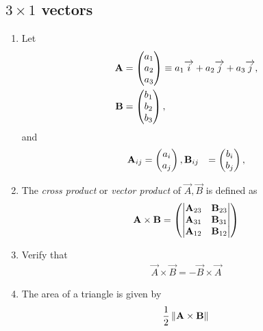 \documentclass[journal,12pt,twocolumn]{IEEEtran}
\renewcommand\thesection{\arabic{section}}
\renewcommand\thesubsection{\thesection.\arabic{subsection}}
\begin{document}
\subsection{$3\times 1$ vectors}
\renewcommand{\theequation}{\theenumi}
\begin{enumerate}[label=\thesubsection.\arabic*.,ref=\thesubsection.\theenumi]

\item Let 
\begin{align}
  \mathbf{A} &= \begin{pmatrix}a_1\\a_2 \\ a_3\end{pmatrix} \equiv a_1\overrightarrow{i}+a_2\overrightarrow{j}+a_3\overrightarrow{j}, 
  \\
  \mathbf{B} &= \begin{pmatrix}b_1\\b_2 \\ b_3\end{pmatrix}, 
\end{align}
and 
\begin{align}
  \mathbf{A}_{ij} &= \begin{pmatrix}a_i\\a_j\end{pmatrix}, 
  \mathbf{B}_{ij} &= \begin{pmatrix}b_i\\b_j\end{pmatrix}, 
\end{align}

\item The {\em cross product} or {\em vector product} of $\vec{A}, \vec{B}$ is defined as
\begin{align}
  \label{eq:cross3d}
	\mathbf{A} \times \mathbf{B} = \begin{pmatrix} \begin{vmatrix}\mathbf{A}_{23} & \mathbf{B}_{23}\end{vmatrix} \\ \begin{vmatrix}\mathbf{A}_{31} & \mathbf{B}_{31}\end{vmatrix} \\ \begin{vmatrix}\mathbf{A}_{12}  & \mathbf{B}_{12}\end{vmatrix}\end{pmatrix}
\end{align}
\item Verify that
\begin{align}
  \vec{A} \times \vec{B} = -  \vec{B} \times \vec{A} 
\end{align}
\item The area of a triangle is given by 
\begin{align}
	\frac{1}{2} \left\lVert  \mathbf{A} \times \mathbf{B}\right\rVert
\end{align}
\end{enumerate}
\end{document}
